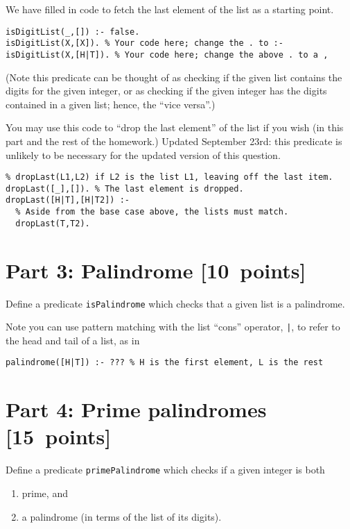\documentclass[11pt]{article}
\begin{document}
We have filled in code to fetch the last element of the list
as a starting point.
\begin{verbatim}
isDigitList(_,[]) :- false.
isDigitList(X,[X]). % Your code here; change the . to :-
isDigitList(X,[H|T]). % Your code here; change the above . to a ,
\end{verbatim}

(Note this predicate can be thought of as checking if the given list contains
the digits for the given integer, or as checking if the given integer
has the digits contained in a given list; hence, the “vice versa”.)

You may use this code to “drop the last element” of the list
if you wish (in this part and the rest of the homework.)
Updated September 23rd: this predicate is unlikely to be necessary
for the updated version of this question.
\begin{verbatim}
% dropLast(L1,L2) if L2 is the list L1, leaving off the last item.
dropLast([_],[]). % The last element is dropped.
dropLast([H|T],[H|T2]) :-
  % Aside from the base case above, the lists must match.
  dropLast(T,T2).
\end{verbatim}

\section*{Part 3: Palindrome                                     [10 points]}
\label{sec:org7720ce1}
Define a predicate \texttt{isPalindrome} which checks that a given
list is a palindrome.

Note you can use pattern matching with the list “cons” operator, \texttt{|},
to refer to the head and tail of a list, as in
\begin{verbatim}
palindrome([H|T]) :- ??? % H is the first element, L is the rest
\end{verbatim}

\section*{Part 4: Prime palindromes                              [15 points]}
\label{sec:org7c12051}
Define a predicate \texttt{primePalindrome} which checks
if a given integer is both
\begin{enumerate}
\item prime, and
\item a palindrome (in terms of the list of its digits).
\end{enumerate}
\end{document}
